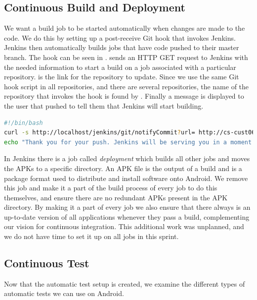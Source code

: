 \subsection{Continuous Build and Deployment}\label{sec:auto_deploy}
We want a build job to be started automatically when changes are made to the code. We do this by setting up a post-receive Git hook that invokes Jenkins. Jenkins then automatically builds jobs that have code pushed to their master branch. The hook can be seen in .  sends an HTTP GET request to Jenkins with the needed information to start a build on a job associated with a particular repository.  is the link for the repository to update. Since we use the same Git hook script in all repositories, and there are several repositories, the name of the repository that invokes the hook is found by . Finally a message is displayed to the user that pushed to tell them that Jenkins will start building.

\begin{lstlisting}[float=tbp,language=bash,showstringspaces=false,caption=The post-receive Git hook. It is a Bash script that starts a job on Jenkins upon a push to a Git repository,label=lst:hook_script_first]
#!/bin/bash
curl -s http://localhost/jenkins/git/notifyCommit?url= http://cs-cust06-int.cs.aau.dk/git-ro/$(basename $(pwd)) > /dev/null
echo "Thank you for your push. Jenkins will be serving you in a moment."
\end{lstlisting}

In Jenkins there is a job called \emph{deployment} which builds all other jobs and moves the APKs to a specific directory. An APK file is the output of a build and is a package format used to distribute and install software onto Android. We remove this job and make it a part of the build process of every job to do this themselves, and ensure there are no redundant APKs present in the APK directory. By making it a part of every job we also ensure that there always is an up-to-date version of all applications whenever they pass a build, complementing our vision for continuous integration. This additional work was unplanned, and we do not have time to set it up on all jobs in this sprint.

\subsection{Continuous Test}
\label{sec:test_automation}
Now that the automatic test setup is created, we examine the different types of automatic tests we can use on Android.

